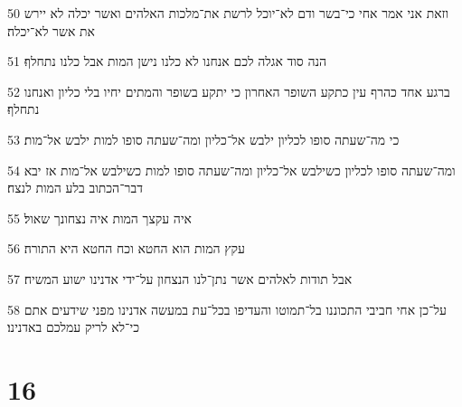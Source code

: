\par 50 וזאת אני אמר אחי כי־בשר ודם לא־יוכל לרשת את־מלכות האלהים ואשר יכלה לא יירש את אשר לא־יכלה׃
\par 51 הנה סוד אגלה לכם אנחנו לא כלנו נישן המות אבל כלנו נתחלף׃
\par 52 ברגע אחד כהרף עין כתקע השופר האחרון כי יתקע בשופר והמתים יחיו בלי כליון ואנחנו נתחלף׃
\par 53 כי מה־שעתה סופו לכליון ילבש אל־כליון ומה־שעתה סופו למות ילבש אל־מות׃
\par 54 ומה־שעתה סופו לכליון כשילבש אל־כליון ומה־שעתה סופו למות כשילבש אל־מות אז יבא דבר־הכתוב בלע המות לנצח׃
\par 55 איה עקצך המות איה נצחונך שאול׃
\par 56 עקץ המות הוא החטא וכח החטא היא התורה׃
\par 57 אבל תודות לאלהים אשר נתן־לנו הנצחון על־ידי אדנינו ישוע המשיח׃
\par 58 על־כן אחי חביבי התכוננו בל־תמוטו והעדיפו בכל־עת במעשה אדנינו מפני שידעים אתם כי־לא לריק עמלכם באדנינו׃

\chapter{16}

